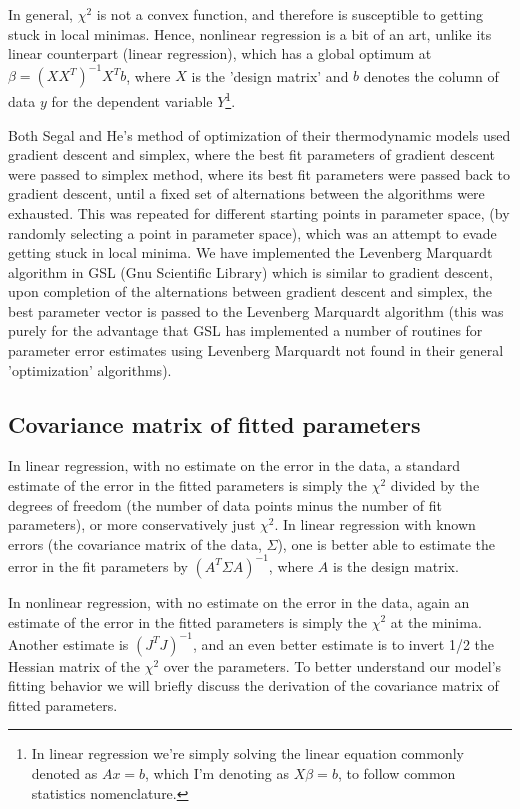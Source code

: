 In general, $\chi^2$ is not a convex function, and therefore is susceptible to getting stuck in local minimas.  Hence, nonlinear regression is a bit of an art\cite{press_etal:1996}, unlike its linear counterpart (linear regression), which has a global optimum at $\beta=(XX^T)^{-1}X^Tb$, where $X$ is the 'design matrix' and $b$ denotes the column of data $y$ for the dependent variable $Y$\footnote{In linear regression we're simply solving the linear equation commonly denoted as $Ax=b$, which I'm denoting as $X\beta=b$, to follow common statistics nomenclature.}.

Both Segal and He's method of optimization of their thermodynamic models used gradient descent and simplex, where the best fit parameters of gradient descent were passed to simplex method, where its best fit parameters were passed back to gradient descent, until a fixed set of alternations between the algorithms were exhausted.  This was repeated for different starting points in parameter space, (by randomly selecting a point in parameter space), which was an attempt to evade getting stuck in local minima.  We have implemented the Levenberg Marquardt algorithm in GSL (Gnu Scientific Library) which is similar to gradient descent, upon completion of the alternations between gradient descent and simplex, the best parameter vector is passed to the Levenberg Marquardt algorithm (this was purely for the advantage that GSL has implemented a number of routines for parameter error estimates using Levenberg Marquardt not found in their general 'optimization' algorithms).

\subsection{Covariance matrix of fitted parameters}
In linear regression, with no estimate on the error in the data, a standard estimate of the error in the fitted parameters is simply the $\chi^2$ divided by the degrees of freedom (the number of data points minus the number of fit parameters), or more conservatively just $\chi^2$.  In linear regression with known errors (the covariance matrix of the data, $\Sigma$), one is better able to estimate the error in the fit parameters by $(A^T\Sigma A)^{-1}$, where $A$ is the design matrix.

In nonlinear regression, with no estimate on the error in the data, again an estimate of the error in the fitted parameters is simply the $\chi^2$ at the minima.  Another estimate is $(J^TJ)^{-1}$, and an even better estimate is to invert 1/2 the Hessian matrix of the $\chi^2$ over the parameters.  To better understand our model's fitting behavior we will briefly discuss the derivation of the covariance matrix of fitted parameters.


